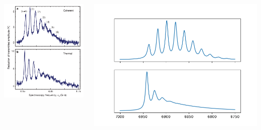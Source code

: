 \documentclass[12pt,hyperref={CJKbookmarks=true}]{beamer}
\begin{document}
\begin{frame}[t]
\begin{columns}
\begin{column}{0.4\linewidth}
    \centering
    \includegraphics[width=\linewidth]{figure/thermal_origin.png}
\end{column}%
\begin{column}{0.6\linewidth}
	\centering
    \includegraphics[width=\linewidth]{figure/thermal.png}

\end{column}
\end{columns}
\end{frame}
\end{document}

